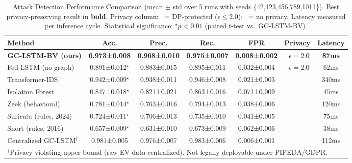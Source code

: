\documentclass[journal]{IEEEtran}
\newcommand{\cmark}{\ding{51}}
\newcommand{\xmark}{\ding{55}}
\begin{document}
\begin{table}[t]
\caption{Attack Detection Performance Comparison (mean $\pm$ std over 5 runs with seeds \{42,123,456,789,1011\}). Best privacy-preserving result in \textbf{bold}. Privacy column: \cmark~= DP-protected ($\epsilon \leq 2.0$); \xmark~= no privacy. Latency measured per inference cycle. Statistical significance: $^\star p<0.01$ (paired $t$-test vs.\ GC-LSTM-BV).}
\label{tab:results}
\centering
\small
\begin{tabular}{lcccccc}
\toprule
\textbf{Method} & \textbf{Acc.} & \textbf{Prec.} & \textbf{Rec.} & \textbf{FPR} & \textbf{Privacy} & \textbf{Latency} \\
\midrule
\textbf{GC-LSTM-BV (ours)} & \textbf{0.973±0.008} & \textbf{0.968±0.010} & \textbf{0.975±0.007} & \textbf{0.008±0.002} & \cmark~$\epsilon=2.0$ & \textbf{87ms} \\
\midrule
Fed-LSTM (no graph)        & 0.891±0.012$^\star$ & 0.883±0.015 & 0.895±0.011 & 0.032±0.004 & \cmark~$\epsilon=2.0$ & 62ms \\
Transformer-IDS~\cite{ahmed_transformer} & 0.942±0.009$^\star$ & 0.938±0.011 & 0.946±0.008 & 0.021±0.003 & \xmark & 340ms \\
Isolation Forest           & 0.847±0.018$^\star$ & 0.821±0.021 & 0.863±0.016 & 0.071±0.009 & \xmark & 45ms \\
Zeek (behavioral)          & 0.781±0.014$^\star$ & 0.763±0.016 & 0.794±0.013 & 0.038±0.006 & \xmark & 120ms \\
Suricata (rules, 2024)     & 0.724±0.011$^\star$ & 0.706±0.013 & 0.735±0.010 & 0.041±0.005 & \xmark & 75ms \\
Snort (rules, 2016)        & 0.657±0.009$^\star$ & 0.631±0.010 & 0.673±0.009 & 0.062±0.006 & \xmark & 38ms \\
\midrule
Centralized GC-LSTM$^\dagger$ & 0.981±0.005 & 0.976±0.007 & 0.983±0.006 & 0.006±0.001 & \xmark & 112ms \\
\midrule
\multicolumn{7}{l}{$^\dagger$Privacy-violating upper bound (raw EV data centralized). Not legally deployable under PIPEDA/GDPR.}\\
\bottomrule
\end{tabular}
\end{table}
\end{document}
